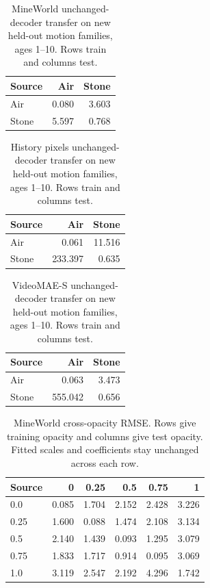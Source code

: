 \begin{table}[!htbp]
\centering\small
\caption{MineWorld unchanged-decoder transfer on new held-out motion families, ages 1--10. Rows train and columns test.}
\label{tab:motion-transfer-MW_700M}
\begin{tabular}{@{}lrr@{}}
\toprule
Source & Air & Stone\\
\midrule
Air & 0.080 & 3.603\\
Stone & 5.597 & 0.768\\
\bottomrule
\end{tabular}
\end{table}

\begin{table}[!htbp]
\centering\small
\caption{History pixels unchanged-decoder transfer on new held-out motion families, ages 1--10. Rows train and columns test.}
\label{tab:motion-transfer-PIXEL_HISTORY16}
\begin{tabular}{@{}lrr@{}}
\toprule
Source & Air & Stone\\
\midrule
Air & 0.061 & 11.516\\
Stone & 233.397 & 0.635\\
\bottomrule
\end{tabular}
\end{table}

\begin{table}[!htbp]
\centering\small
\caption{VideoMAE-S unchanged-decoder transfer on new held-out motion families, ages 1--10. Rows train and columns test.}
\label{tab:motion-transfer-VIDEOMAE_S}
\begin{tabular}{@{}lrr@{}}
\toprule
Source & Air & Stone\\
\midrule
Air & 0.063 & 3.473\\
Stone & 555.042 & 0.656\\
\bottomrule
\end{tabular}
\end{table}

\clearpage
\begin{table}[!htbp]
\centering\small
\caption{MineWorld cross-opacity RMSE. Rows give training opacity and columns give test opacity. Fitted scales and coefficients stay unchanged across each row.}
\label{tab:opacity-OPACITY_MW}
\begin{tabular}{@{}lrrrrr@{}}
\toprule
Source & 0 & 0.25 & 0.5 & 0.75 & 1\\
\midrule
0.0 & 0.085 & 1.704 & 2.152 & 2.428 & 3.226\\
0.25 & 1.600 & 0.088 & 1.474 & 2.108 & 3.134\\
0.5 & 2.140 & 1.439 & 0.093 & 1.295 & 3.079\\
0.75 & 1.833 & 1.717 & 0.914 & 0.095 & 3.069\\
1.0 & 3.119 & 2.547 & 2.192 & 4.296 & 1.742\\
\bottomrule
\end{tabular}
\end{table}

